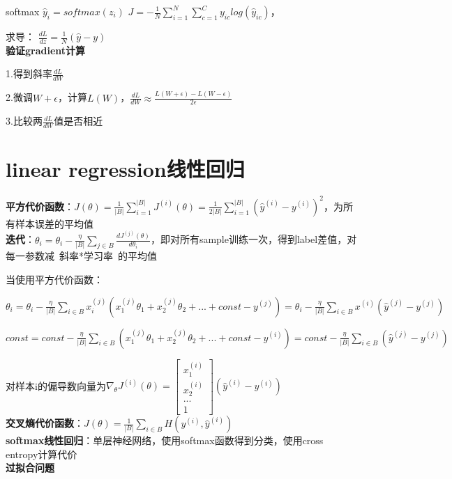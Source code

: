 \documentclass[UTF8]{ctexart}
\begin{document}
  softmax $\hat{y}_i = softmax(z_i)$ $J = -\frac{1}{N}\sum_{i=1}^{N}\sum_{c=1}^{C}y_{ic}log(\hat{y}_{ic})$，
  
  \quad 求导： $\frac{dL}{dz} = \frac{1}{N}(\hat{y} - y)$\\
\textbf{验证gradient计算}

  1.得到斜率$\frac{dL}{dW}$

  2.微调$W + \epsilon$，计算$L(W)$，$\frac{dL}{dW} \approx \frac{L(W + \epsilon) - L(W - \epsilon)}{2\epsilon}$

  3.比较两$\frac{dL}{dW}$值是否相近

\section{linear regression线性回归}
\noindent \textbf{平方代价函数}：$J(\theta ) = \frac{1}{|B|} \sum_{i = 1}^{|B|} J^{(i)}(\theta ) = \frac{1}{2|B|} \sum_{i = 1}^{|B|} (\hat{y}^{(i)} - y^{(i)})^2  $，为所有样本误差的平均值\\
\textbf{迭代}：$\theta_i = \theta_i - \frac{\eta}{|B|}\sum_{j\in B} \frac{d J^{(j)}(\theta)}{d \theta_i}$，即对所有sample训练一次，得到label差值，对每一参数减\ 斜率*学习率\ 的平均值
  
  当使用平方代价函数：
  
  \quad $\theta_i = \theta_i - \frac{\eta}{|B|}\sum_{i\in B} x^{(j)}_i(x^{(j)}_1\theta_1 + x^{(j)}_2\theta_2 + ... + const - y^{(j)}) = \theta_i - \frac{\eta}{|B|}\sum_{i\in B}x^{(i)}(\hat{y}^{(j)} - y^{(j)})$

  \quad $const = const - \frac{\eta}{|B|}\sum_{i\in B} (x^{(j)}_1\theta_1 + x^{(j)}_2\theta_2 + ... + const - y^{(i)}) = const - \frac{\eta}{|B|}\sum_{i\in B}(\hat{y}^{(j)} - y^{(j)})$

  \quad 对样本i的偏导数向量为$\nabla _{\theta}J^{(i)}(\theta) = 
    \begin{bmatrix}
    x^{(i)}_1 \\
    x^{(i)}_2 \\
    ... \\
    1
    \end{bmatrix}(\hat{y}^{(i)} - y^{(i)})
    $\\
\textbf{交叉熵代价函数}：$J(\theta) = \frac{1}{|B|}\sum_{i\in B} H(y^{(i)}, \hat{y}^{(i)})$\\
\textbf{softmax线性回归}：单层神经网络，使用softmax函数得到分类，使用cross entropy计算代价\\
\textbf{过拟合问题}
\end{document}
